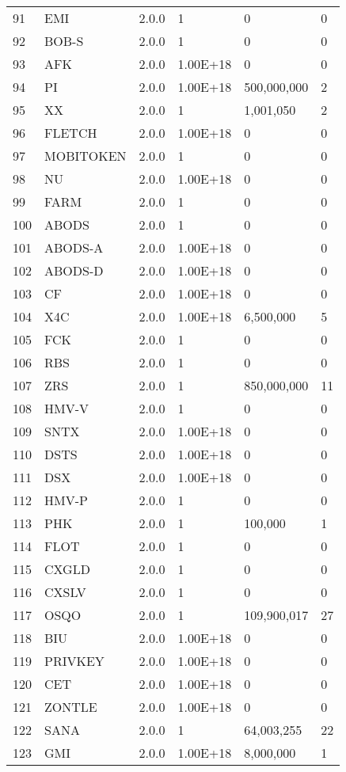\begin{longtable}{llllll}
91 & EMI & 2.0.0 & 1 & 0 & 0 \\
92 & BOB-S & 2.0.0 & 1 & 0 & 0 \\
93 & AFK & 2.0.0 & 1.00E+18 & 0 & 0 \\
94 & PI & 2.0.0 & 1.00E+18 & 500,000,000 & 2 \\
95 & XX & 2.0.0 & 1 & 1,001,050 & 2 \\
96 & FLETCH & 2.0.0 & 1.00E+18 & 0 & 0 \\
97 & MOBITOKEN & 2.0.0 & 1 & 0 & 0 \\
98 & NU & 2.0.0 & 1.00E+18 & 0 & 0 \\
99 & FARM & 2.0.0 & 1 & 0 & 0 \\
100 & ABODS & 2.0.0 & 1 & 0 & 0 \\
101 & ABODS-A & 2.0.0 & 1.00E+18 & 0 & 0 \\
102 & ABODS-D & 2.0.0 & 1.00E+18 & 0 & 0 \\
103 & CF & 2.0.0 & 1.00E+18 & 0 & 0 \\
104 & X4C & 2.0.0 & 1.00E+18 & 6,500,000 & 5 \\
105 & FCK & 2.0.0 & 1 & 0 & 0 \\
106 & RBS & 2.0.0 & 1 & 0 & 0 \\
107 & ZRS & 2.0.0 & 1 & 850,000,000 & 11 \\
108 & HMV-V & 2.0.0 & 1 & 0 & 0 \\
109 & SNTX & 2.0.0 & 1.00E+18 & 0 & 0 \\
110 & DSTS & 2.0.0 & 1.00E+18 & 0 & 0 \\
111 & DSX & 2.0.0 & 1.00E+18 & 0 & 0 \\
112 & HMV-P & 2.0.0 & 1 & 0 & 0 \\
113 & PHK & 2.0.0 & 1 & 100,000 & 1 \\
114 & FLOT & 2.0.0 & 1 & 0 & 0 \\
115 & CXGLD & 2.0.0 & 1 & 0 & 0 \\
116 & CXSLV & 2.0.0 & 1 & 0 & 0 \\
117 & OSQO & 2.0.0 & 1 & 109,900,017 & 27 \\
118 & BIU & 2.0.0 & 1.00E+18 & 0 & 0 \\
119 & PRIVKEY & 2.0.0 & 1.00E+18 & 0 & 0 \\
120 & CET & 2.0.0 & 1.00E+18 & 0 & 0 \\
121 & ZONTLE & 2.0.0 & 1.00E+18 & 0 & 0 \\
122 & SANA & 2.0.0 & 1 & 64,003,255 & 22 \\
123 & GMI & 2.0.0 & 1.00E+18 & 8,000,000 & 1 \\

\end{longtable}
